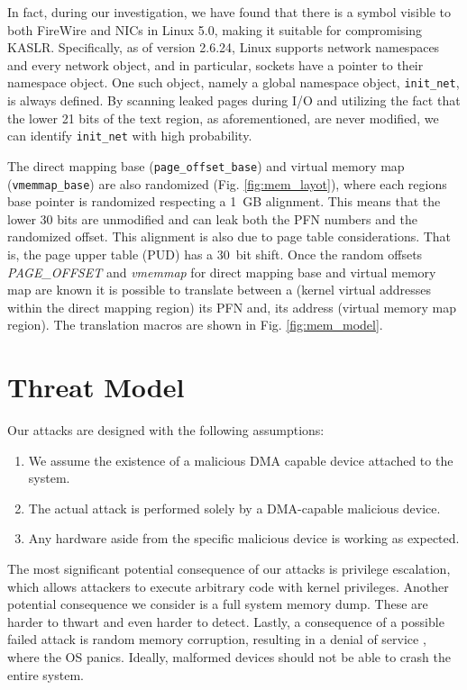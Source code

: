 In fact, during our investigation, we have found that there is a symbol visible to both FireWire and NICs in Linux 5.0, making it suitable for compromising KASLR. Specifically, as of version 2.6.24, Linux supports network namespaces and every network object, and in particular, sockets have a pointer to their namespace object. One such object, namely a global namespace object, \texttt{init\_net}, is always defined. By scanning leaked pages during I/O and utilizing the fact that the lower 21 bits of the text region, as aforementioned, are never modified, we can identify \texttt{init\_net} with high probability.

The direct mapping base (\texttt{page\_offset\_base}) and virtual memory map (\texttt{vmemmap\_base}) are also randomized (Fig. \ref{fig:mem_layot}), where each regions base pointer is randomized respecting a 1~GB alignment. This means that the lower 30 bits are unmodified and can leak both the PFN numbers and the randomized offset. This alignment is also due to page table considerations. That is, the page upper table (PUD) has a 30~bit shift. Once the random offsets \textit{PAGE\_OFFSET} and \textit{vmemmap} for direct mapping base and virtual memory map are known it is possible to translate between a \kva{} (kernel virtual addresses within the direct mapping region) its PFN and, its \page{} address (virtual memory map region). The translation macros are shown in Fig. \ref{fig:mem_model}. 

\section{Threat Model}\label{sec:threat_model}

Our attacks are designed with the following assumptions:
\begin{enumerate}
    \item We assume the existence of a malicious DMA capable device attached to the system.
    \item The actual attack is performed solely by a DMA-capable malicious device.
    \item Any hardware aside from the specific malicious device is working as expected.
 \end{enumerate}

The most significant potential consequence of our attacks is privilege escalation, which allows attackers to execute arbitrary code with kernel privileges. Another potential consequence we consider is a full system memory dump. These are harder to thwart and even harder to detect. Lastly, a consequence of a possible failed attack is random memory corruption, resulting in a denial of service \cite{MMT16}, where the OS panics. Ideally, malformed devices should not be able to crash the entire system. 

